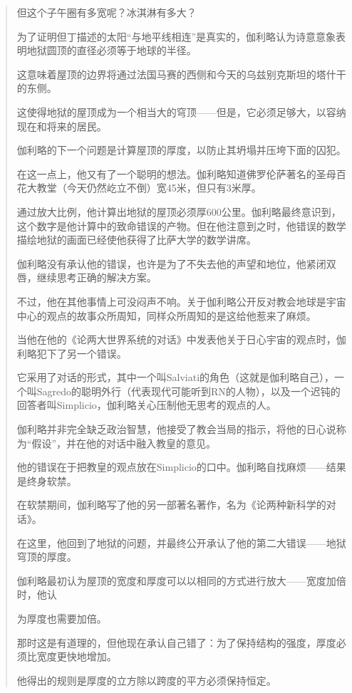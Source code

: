 \begin{quote}
    但这个子午圈有多宽呢？冰淇淋有多大？
    
    为了证明但丁描述的太阳“与地平线相连”是真实的，伽利略认为诗意意象表明地狱圆顶的直径必须等于地球的半径。
    
    这意味着屋顶的边界将通过法国马赛的西侧和今天的乌兹别克斯坦的塔什干的东侧。
    
    这使得地狱的屋顶成为一个相当大的穹顶——但是，它必须足够大，以容纳现在和将来的居民。
    
    伽利略的下一个问题是计算屋顶的厚度，以防止其坍塌并压垮下面的囚犯。
    
    在这一点上，他又有了一个聪明的想法。伽利略知道佛罗伦萨著名的圣母百花大教堂（今天仍然屹立不倒）宽45米，但只有3米厚。
    
    通过放大比例，他计算出地狱的屋顶必须厚600公里。伽利略最终意识到，这个数字是他计算中的致命错误的产物。但在他注意到之时，他错误的数学描绘地狱的画面已经使他获得了比萨大学的数学讲席。
    
    伽利略没有承认他的错误，也许是为了不失去他的声望和地位，他紧闭双唇，继续思考正确的解决方案。
    
    不过，他在其他事情上可没闷声不响。关于伽利略公开反对教会地球是宇宙中心的观点的故事众所周知，同样众所周知的是这给他惹来了麻烦。
    
    当他在他的《论两大世界系统的对话》中发表他关于日心宇宙的观点时，伽利略犯下了另一个错误。
    
    它采用了对话的形式，其中一个叫Salviati的角色（这就是伽利略自己），一个叫Sagredo的聪明外行（代表现代可能听到RN的人物），以及一个迟钝的回答者叫Simplicio，伽利略关心压制他无思考的观点的人。
    
    伽利略并非完全缺乏政治智慧，他接受了教会当局的指示，将他的日心说称为“假设”，并在他的对话中融入教皇的意见。
    
    他的错误在于把教皇的观点放在Simplicio的口中。伽利略自找麻烦——结果是终身软禁。
    
    在软禁期间，伽利略写了他的另一部著名著作，名为《论两种新科学的对话》。
    
    在这里，他回到了地狱的问题，并最终公开承认了他的第二大错误——地狱穹顶的厚度。
    
    伽利略最初认为屋顶的宽度和厚度可以以相同的方式进行放大——宽度加倍时，他认
    
    为厚度也需要加倍。
    
    那时这是有道理的，但他现在承认自己错了：为了保持结构的强度，厚度必须比宽度更快地增加。
    
    他得出的规则是厚度的立方除以跨度的平方必须保持恒定。
    

\end{quote}
